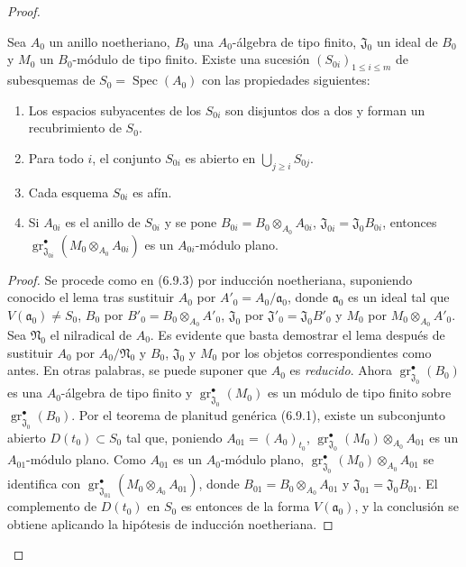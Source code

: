 \begin{proof}
\begin{lemma}[11.2.9.5]
\label{IV.11.2.9.5}
Sea $A_0$ un anillo noetheriano, $B_0$ una
$A_0$-álgebra de tipo finito, $\mathfrak J_0$ un ideal de
$B_0$ y $M_0$ un $B_0$-módulo de tipo finito.
Existe una sucesión $(S_{0i})_{1\leq i\leq m}$ de
subesquemas de $S_0=\operatorname{Spec}(A_0)$ con las propiedades
siguientes:
\begin{enumerate}[label=\textup{\arabic{enumi}}\textsuperscript{o}]
  \item Los espacios subyacentes de los $S_{0i}$ son disjuntos dos a dos y forman un recubrimiento de $S_0$.
  \item Para todo $i$, el conjunto $S_{0i}$ es abierto en $\bigcup_{j\geq i}S_{0j}$.
  \item Cada esquema $S_{0i}$ es afín.
  \item Si $A_{0i}$ es el anillo de $S_{0i}$ y se pone $B_{0i}=B_0\otimes_{A_0}A_{0i}$, $\mathfrak J_{0i}=\mathfrak J_0B_{0i}$, entonces $\operatorname{gr}_{\mathfrak J_{0i}}^\bullet(M_0\otimes_{A_0}A_{0i})$ es un $A_{0i}$-módulo plano.
\end{enumerate}
\end{lemma}

\begin{proof}
Se procede como en (6.9.3) por inducción noetheriana, suponiendo conocido el lema tras sustituir $A_0$ por
$A'_0=A_0/\mathfrak a_0$,
donde $\mathfrak a_0$ es un ideal tal que $V(\mathfrak a_0)\neq S_0$, $B_0$ por $B'_0=B_0\otimes_{A_0}A'_0$, $\mathfrak J_0$ por
$\mathfrak J'_0=\mathfrak J_0B'_0$ y $M_0$ por $M_0\otimes_{A_0}A'_0$. Sea $\mathfrak N_0$ el nilradical de $A_0$. Es
evidente que basta demostrar el lema después de sustituir $A_0$ por
$A_0/\mathfrak N_0$ y $B_0$,
$\mathfrak J_0$ y $M_0$ por los objetos correspondientes como antes. En otras palabras, se puede suponer que $A_0$ es \emph{reducido}. Ahora
$\operatorname{gr}_{\mathfrak J_0}^\bullet(B_0)$ es una
$A_0$-álgebra de tipo finito y
$\operatorname{gr}_{\mathfrak J_0}^\bullet(M_0)$ es un módulo de tipo finito sobre
$\operatorname{gr}_{\mathfrak J_0}^\bullet(B_0)$. Por el teorema de
planitud genérica (6.9.1), existe un subconjunto abierto
$D(t_0)\subset S_0$ tal que, poniendo
$A_{01}=(A_0)_{t_0}$,
$\operatorname{gr}_{\mathfrak J_0}^\bullet(M_0)\otimes_{A_0}A_{01}$
es un $A_{01}$-módulo plano. Como $A_{01}$ es un $A_0$-módulo plano, $\operatorname{gr}_{\mathfrak J_0}^\bullet(M_0)\otimes_{A_0}A_{01}$ se identifica con
$\operatorname{gr}_{\mathfrak J_{01}}^\bullet(M_0\otimes_{A_0}A_{01})$,
donde
$B_{01}=B_0\otimes_{A_0}A_{01}$ y $\mathfrak J_{01}=\mathfrak J_0B_{01}$.
El complemento de $D(t_0)$ en $S_0$ es entonces de la forma $V(\mathfrak a_0)$, y la conclusión se obtiene aplicando la hipótesis de inducción noetheriana.
\end{proof}


\end{proof}

